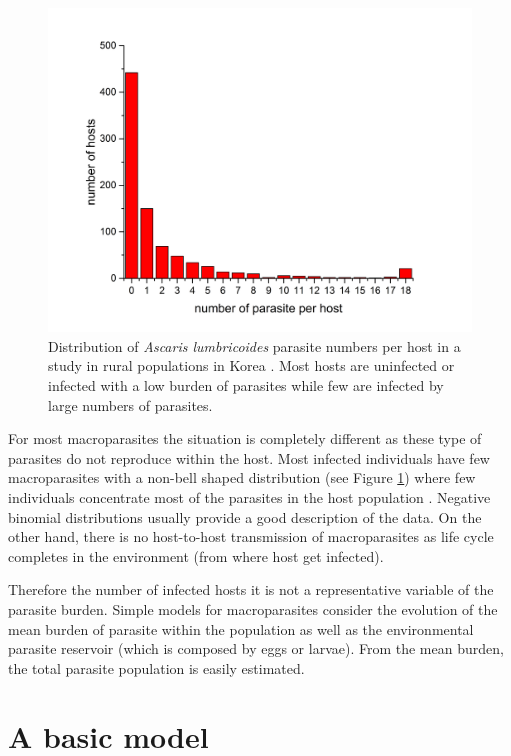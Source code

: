 \documentclass[12pt,a4paper]{article}
\theoremstyle{plain}%
\theoremstyle{definition}
\theoremstyle{remark}
\begin{document}
\begin{figure}[t!]
	\centering
	\includegraphics[width=0.99\linewidth]{dataseo}
	\caption{Distribution of \textit{Ascaris lumbricoides} parasite numbers per host in a study in rural populations in Korea \cite{seo1979frequency}. 
	Most hosts are uninfected or infected with a low burden of parasites while few are infected by large numbers of parasites.}
	\label{fig:dataseo}
\end{figure}

For most macroparasites the situation is completely different as these type of parasites do not reproduce within the host.  Most  infected  individuals have few macroparasites with a non-bell shaped distribution (see Figure \ref{fig:dataseo}) where few individuals concentrate most of the parasites in the host population \cite{seo1979frequency,lopez2022simple}. Negative binomial distributions usually provide a good description of the data. On the other hand, there is no host-to-host transmission of macroparasites as life cycle completes in the environment (from where host get infected).  


Therefore the number of infected hosts it is not a representative variable of the parasite burden. Simple models for macroparasites consider the evolution of the mean burden of parasite within the population as well as the environmental parasite reservoir (which is composed by eggs or larvae). From the mean burden, the total parasite population is easily estimated. 


	
\section{A basic model}
\label{s:basicmodel}
 
\end{document}

